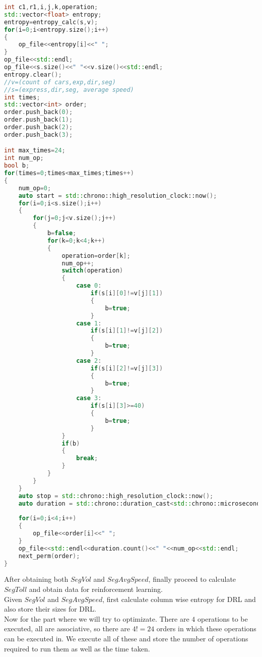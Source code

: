 \begin{lstlisting}[language=C++]
int c1,r1,i,j,k,operation;
std::vector<float> entropy;
entropy=entropy_calc(s,v);
for(i=0;i<entropy.size();i++)
{
    op_file<<entropy[i]<<" ";
}
op_file<<std::endl;
op_file<<s.size()<<" "<<v.size()<<std::endl;
entropy.clear();
//v=(count of cars,exp,dir,seg)
//s=(express,dir,seg, average speed)
int times;
std::vector<int> order;
order.push_back(0);
order.push_back(1);
order.push_back(2);
order.push_back(3);

int max_times=24;
int num_op;
bool b;
for(times=0;times<max_times;times++)
{
    num_op=0;
    auto start = std::chrono::high_resolution_clock::now();
    for(i=0;i<s.size();i++)
    {
        for(j=0;j<v.size();j++)
        {
            b=false;
            for(k=0;k<4;k++)
            {
                operation=order[k];
                num_op++;
                switch(operation)
                {
                    case 0:
                        if(s[i][0]!=v[j][1])
                        {
                            b=true;
                        }
                    case 1:
                        if(s[i][1]!=v[j][2])
                        {
                            b=true;
                        }
                    case 2:
                        if(s[i][2]!=v[j][3])
                        {
                            b=true;
                        }
                    case 3:
                        if(s[i][3]>=40)
                        {
                            b=true;
                        }
                }
                if(b)
                {
                    break;
                }
            }
        }
    }
    auto stop = std::chrono::high_resolution_clock::now(); 
    auto duration = std::chrono::duration_cast<std::chrono::microseconds>(stop - start);
    
    for(i=0;i<4;i++)
    {
        op_file<<order[i]<<" ";
    }
    op_file<<std::endl<<duration.count()<<" "<<num_op<<std::endl;
    next_perm(order);
}
\end{lstlisting}
After obtaining both $SegVol$ and $SegAvgSpeed$, finally proceed to calculate $SegToll$ and obtain data for reinforcement learning.\\
Given $SegVol$ and $SegAvgSpeed$, first calculate column wise entropy for DRL and also store their sizes for DRL.\\
Now for the part where we will try to optimizate. There are $4$ operations to be executed, all are associative, so there are $4!=24$ orders in which these operations can be executed in. We execute all of these and store the number of operations required to run them as well as the time taken.\\

